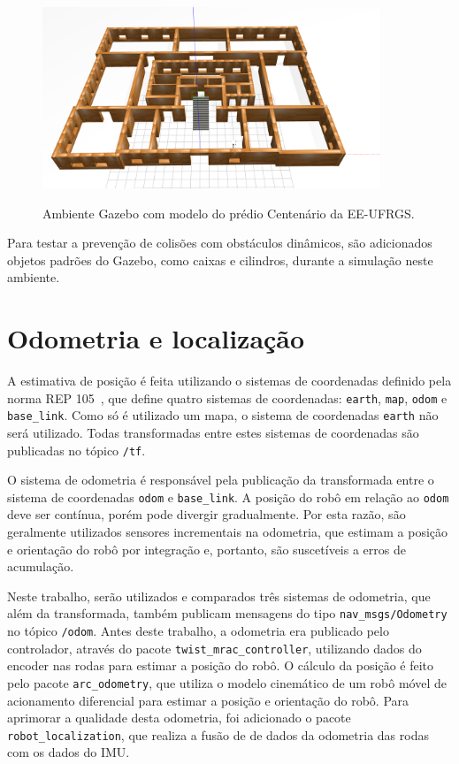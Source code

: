 \documentclass[repeatfields,xlists,xpacks,oneside,yearsonly]{ufrgscca}
\begin{document}
\begin{figure}[h]
    {
        \centering
        \caption{Ambiente Gazebo com modelo do prédio Centenário da EE-UFRGS.}
        \label{fig:gazebo_centenario}
        \includegraphics[width=0.9\textwidth]{gazebo.png}\\
    }
\end{figure}

Para testar a prevenção de colisões com obstáculos dinâmicos, são
adicionados objetos padrões do Gazebo, como caixas e cilindros,
durante a simulação neste ambiente.

\section{Odometria e localização}

A estimativa de posição é feita utilizando o sistemas de coordenadas definido pela
norma REP 105~\cite{rep_105}, que define quatro sistemas de coordenadas: \texttt{earth},
\texttt{map}, \texttt{odom} e \texttt{base\_link}.
Como só é utilizado um mapa, o sistema de coordenadas \texttt{earth} não será utilizado.
Todas transformadas entre estes sistemas de coordenadas são
publicadas no tópico \texttt{/tf}.

O sistema de odometria é responsável pela publicação da transformada entre o sistema
de coordenadas \texttt{odom} e \texttt{base\_link}.
A posição do robô em relação ao \texttt{odom} deve ser contínua, porém pode divergir
gradualmente. Por esta razão, são geralmente utilizados sensores incrementais na
odometria, que estimam a posição e orientação do robô por integração e, portanto,
são suscetíveis a erros de acumulação.

Neste trabalho, serão utilizados e comparados três sistemas de odometria,
que além da transformada, também publicam mensagens do tipo
\texttt{nav\_msgs/Odometry} no tópico \texttt{/odom}.
Antes deste trabalho, a odometria era publicado pelo controlador,
através do pacote \texttt{twist\_mrac\_controller}, utilizando
dados do encoder nas rodas para estimar a posição do robô.
O cálculo da posição é feito pelo pacote \texttt{arc\_odometry}, que utiliza
o modelo cinemático de um robô móvel de acionamento diferencial
para estimar a posição e orientação do robô.
Para aprimorar a qualidade desta odometria, foi adicionado o pacote
\texttt{robot\_localization}, que realiza a fusão de
de dados da odometria das rodas com os dados do IMU.
\end{document}

